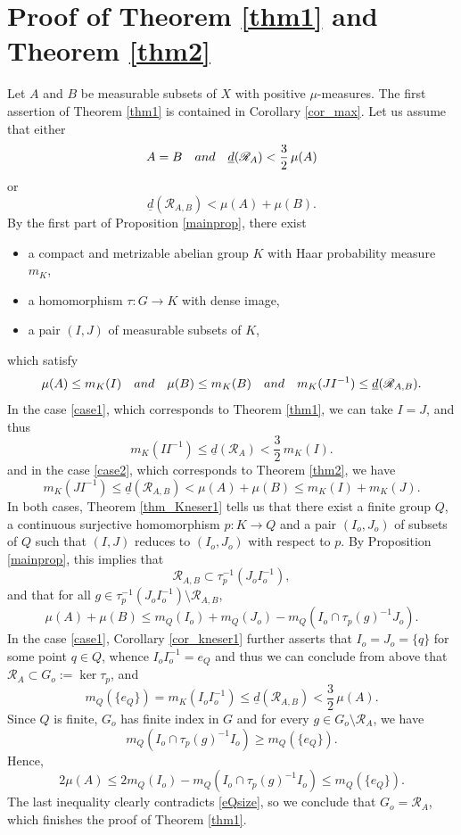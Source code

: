 \documentclass[11pt]{article}
\numberwithin{equation}{section}
\let\mathcal\mathscr
\newcommand{\cR}{\mathcal{R}}
\newcommand{\qand}{\quad\textup{and}\quad}
\theoremstyle{plain}
\theoremstyle{definition}
\begin{document}
\section{Proof of Theorem \ref{thm1} and Theorem \ref{thm2}}

Let $A$ and $B$ be measurable subsets of $X$ with positive $\mu$-measures. The first assertion of Theorem \ref{thm1} is contained
in Corollary \ref{cor_max}. Let us assume that either
\begin{equation}
\label{case1}
A = B \qand \underline{d}(\cR_{A}) < \frac{3}{2}\, \mu(A)
\end{equation}
or
\begin{equation}
\label{case2}
\underline{d}(\cR_{A,B}) < \mu(A) + \mu(B).
\end{equation}
By the first part of Proposition \ref{mainprop}, there exist
\begin{itemize}
\item a compact and metrizable abelian group $K$ with Haar probability measure $m_K$,
\item a homomorphism $\tau : G \to K$ with dense image,
\item a pair $(I,J)$ of measurable subsets of $K$,
\end{itemize}
which satisfy
\[
\mu(A) \leq m_K(I) \qand \mu(B) \leq m_K(B) \qand m_K(JI^{-1}) \leq \underline{d}(\cR_{A,B}).
\]
In the case \eqref{case1}, which corresponds to Theorem \ref{thm1}, we can take $I = J$, and thus
\[
m_K(II^{-1}) \leq \underline{d}(\cR_{A}) < \frac{3}{2} \, m_K(I).
\]
and in the case \eqref{case2}, which corresponds to Theorem \ref{thm2}, we have
\[
m_K(JI^{-1}) \leq \underline{d}(\cR_{A,B}) < \mu(A) + \mu(B) \leq m_K(I) + m_K(J).
\]
In both cases, Theorem \ref{thm_Kneser1} tells us that there exist a finite group $Q$, a continuous surjective homomorphism
$p : K \to Q$ and a pair $(I_o,J_o)$ of subsets of $Q$ such that $(I,J)$ reduces to $(I_o,J_o)$ with respect to $p$.
By Proposition \ref{mainprop}, this implies that
\[
\cR_{A,B} \subset \tau_p^{-1}(J_o I_o^{-1}),
\]
and that for all $g \in \tau_p^{-1}(J_o I_o^{-1}) \setminus \cR_{A,B}$,
\[
\mu(A) + \mu(B) \leq m_Q(I_o) + m_Q(J_o) - m_Q(I_o \cap \tau_p(g)^{-1}J_o).
\]
In the case \eqref{case1}, Corollary \ref{cor_kneser1} further asserts that $I_o = J_o = \{q\}$ for some point $q \in Q$, whence
$I_o I_o^{-1} = e_Q$ and thus we can conclude from above that $\cR_{A} \subset G_o := \ker \tau_p$, and
\begin{equation}
\label{eQsize}
m_Q(\{e_Q\}) = m_K(I_o I_o^{-1}) \leq \underline{d}(\cR_{A,B}) < \frac{3}{2}\, \mu(A).
\end{equation}
Since $Q$ is finite, $G_o$ has finite index in $G$ and for every $g \in G_o \setminus \cR_A$, we have
\[
m_Q(I_o \cap \tau_p(g)^{-1}I_o) \geq m_Q(\{e_Q\}).
\]
Hence,
\[
2\mu(A) \leq 2m_Q(I_o) - m_Q(I_o \cap \tau_p(g)^{-1}I_o) \leq m_Q(\{e_Q\}).
\]
The last inequality clearly contradicts \eqref{eQsize}, so we conclude that $G_o = \cR_A$, which finishes the proof of Theorem \ref{thm1}.
\end{document}
